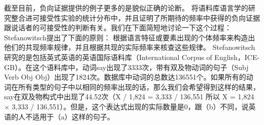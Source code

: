 截至目前，负向证据提供的例子更多的是貌似正确的论断。
 \citet{Stefanowitsch2008a}将语料库语言学的研究整合进可接受性实验的统计分布中，并且证明了所期待的频率中获得的负向证据跟说话者的可接受性的判断有关。我们在下面简短地讨论一下这个过程：Stefanowitsch提出了下面的原则：
\ea
根据语言特征或要素出现的个体频率来构造出他们的共现频率规律，并且根据共现的实际频率来核查这些规律。\citep[]{Stefanowitsch2008a}
\z
Stefanowitsch研究的是包括英式英语的英语国际语料库（International Corpus of English，ICE-GB）。在这个语料库中，动词say出现了3333次，带有双及物动词的句子（Subj Verb Obj Obj）出现了1824次。数据库中动词的总数达136551个。如果所有的动词在所有类型的句子中以相同的频率出现的话，那么我们会希望得到这样的结果，say在双及物构式中出现了44.52次（X / 1,824 = 3,333 / 136,551 所以 X = 1,824 $\times$ 3,333 / 136,551）。但是，这个表达式出现的实际数量是0，跟（b）不同，说英语的人不适用于（a）这样的句子。
\eal
{}
\zl


